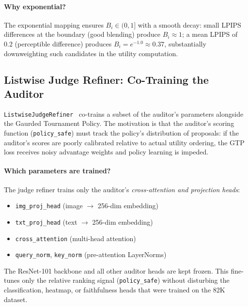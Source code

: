 \paragraph{Why exponential?}
The exponential mapping ensures $B_i \in (0, 1]$ with a smooth decay:
small LPIPS differences at the boundary (good blending) produce $B_i
\approx 1$; a mean LPIPS of $0.2$ (perceptible difference) produces
$B_i = e^{-1.0} \approx 0.37$, substantially downweighting such
candidates in the utility computation.
\iffalse
\subsection{Listwise Judge Refiner: Co-Training the Auditor}
\label{app:tspo_judge}

\texttt{ListwiseJudgeRefiner}~ co-trains a subset of the auditor's parameters alongside the Gaurded Tournament Policy.
The motivation is that the auditor's scoring function (\texttt{policy\_safe})
must track the policy's distribution of proposals: if the auditor's
scores are poorly calibrated relative to actual utility ordering, the
GTP loss receives noisy advantage weights and policy learning is
impeded.

\paragraph{Which parameters are trained?}
The judge refiner trains only the auditor's \emph{cross-attention and
projection heads}:
\begin{itemize}[leftmargin=1.5em,itemsep=1pt,topsep=2pt]
  \item \texttt{img\_proj\_head} (image $\to$ 256-dim embedding)
  \item \texttt{txt\_proj\_head} (text $\to$ 256-dim embedding)
  \item \texttt{cross\_attention} (multi-head attention)
  \item \texttt{query\_norm}, \texttt{key\_norm} (pre-attention LayerNorms)
\end{itemize}
The ResNet-101 backbone and all other auditor heads are kept frozen.
This fine-tunes only the relative ranking signal (\texttt{policy\_safe})
without disturbing the classification, heatmap, or faithfulness heads that
were trained on the 82K dataset.

